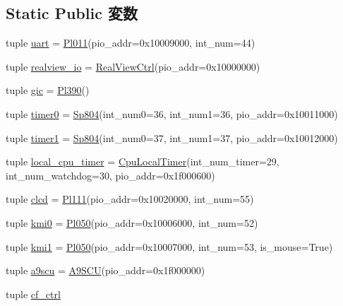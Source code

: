 \subsection*{Static Public 変数}
\begin{DoxyCompactItemize}
\item 
tuple \hyperlink{classRealView_1_1RealViewPBX_a1f69fbabd17d6bca63f97f9754247cfd}{uart} = \hyperlink{classRealView_1_1Pl011}{Pl011}(pio\_\-addr=0x10009000, int\_\-num=44)
\item 
tuple \hyperlink{classRealView_1_1RealViewPBX_a54d7e0216558aeb12a980d61e36094da}{realview\_\-io} = \hyperlink{classRealView_1_1RealViewCtrl}{RealViewCtrl}(pio\_\-addr=0x10000000)
\item 
tuple \hyperlink{classRealView_1_1RealViewPBX_a40243beb62d217c3a9e35801ae739fd0}{gic} = \hyperlink{classPl390}{Pl390}()
\item 
tuple \hyperlink{classRealView_1_1RealViewPBX_af4ebf9ec12f4c51e9fd2eee3647a3932}{timer0} = \hyperlink{classRealView_1_1Sp804}{Sp804}(int\_\-num0=36, int\_\-num1=36, pio\_\-addr=0x10011000)
\item 
tuple \hyperlink{classRealView_1_1RealViewPBX_a43a269dacabf237422bf29f79e52a7e5}{timer1} = \hyperlink{classRealView_1_1Sp804}{Sp804}(int\_\-num0=37, int\_\-num1=37, pio\_\-addr=0x10012000)
\item 
tuple \hyperlink{classRealView_1_1RealViewPBX_a4fac58dbb9d72c639bc0d5836e2e1252}{local\_\-cpu\_\-timer} = \hyperlink{classRealView_1_1CpuLocalTimer}{CpuLocalTimer}(int\_\-num\_\-timer=29, int\_\-num\_\-watchdog=30, pio\_\-addr=0x1f000600)
\item 
tuple \hyperlink{classRealView_1_1RealViewPBX_aca2e883cdc9c636e4500344d5892f6c9}{clcd} = \hyperlink{classRealView_1_1Pl111}{Pl111}(pio\_\-addr=0x10020000, int\_\-num=55)
\item 
tuple \hyperlink{classRealView_1_1RealViewPBX_a4fcef88eafab200d46609dff412add24}{kmi0} = \hyperlink{classRealView_1_1Pl050}{Pl050}(pio\_\-addr=0x10006000, int\_\-num=52)
\item 
tuple \hyperlink{classRealView_1_1RealViewPBX_ad2ff68a98564bfc794ffe30ecd80da6c}{kmi1} = \hyperlink{classRealView_1_1Pl050}{Pl050}(pio\_\-addr=0x10007000, int\_\-num=53, is\_\-mouse=True)
\item 
tuple \hyperlink{classRealView_1_1RealViewPBX_a3f890ed84673729b115e1a537a6bf122}{a9scu} = \hyperlink{classRealView_1_1A9SCU}{A9SCU}(pio\_\-addr=0x1f000000)
\item 
tuple \hyperlink{classRealView_1_1RealViewPBX_a3e7e22e24895378aafbb1c7b707248ae}{cf\_\-ctrl}

\end{DoxyCompactItemize}
